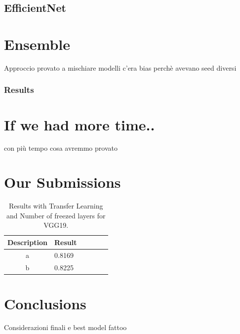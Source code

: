 \documentclass[10pt]{article}
\begin{document}
\subsection{EfficientNet}



\section{Ensemble}
Approccio
provato a mischiare modelli
          c'era bias perchè avevano seed diversi
\subsubsection{Results}



\section{If we had more time..}
con più tempo cosa avremmo provato




\section{Our Submissions}
\begin{table}[ht]
\centering
\begin{adjustbox}{width=240}
\small
\begin{tabular}{|c|l|l|l|l|l}

\hline \bf Description & \bf Result \\ \hline
a & 0.8169 \\
b & 0.8225 \\

\hline
\end{tabular}
\end{adjustbox}
\caption{Results with Transfer Learning and Number of freezed layers for VGG19.}
\end{table}
\section{Conclusions}
Considerazioni finali e best model fattoo

\end{document}
